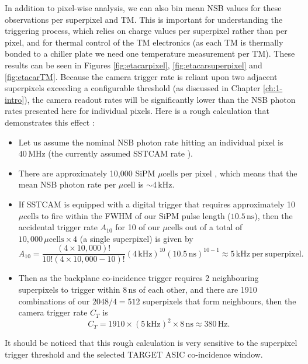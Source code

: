 In addition to pixel-wise analysis, we can also bin mean NSB values for these observations per superpixel and TM. This is important for understanding the triggering process, which relies on charge values per superpixel rather than per pixel, and for thermal control of the TM electronics (as each TM is thermally bonded to a chiller plate we need one temperature measurement per TM). These results can be seen in Figures \ref{fig:etacarpixel}, \ref{fig:etacarsuperpixel} and \ref{fig:etacarTM}. Because the camera trigger rate is reliant upon two adjacent superpixels exceeding a configurable threshold (as discussed in Chapter \ref{ch:1-intro}), the camera readout rates will be significantly lower than the NSB photon rates presented here for individual pixels. Here is a rough calculation that demonstrates this effect \cite{richpc}:

\begin{itemize}
    \item Let us assume the nominal NSB photon rate hitting an individual pixel is $40\,\mathrm{MHz}$ (the currently assumed SSTCAM rate \cite{richpc}).
    \item There are approximately 10,000 SiPM $\mu\textrm{cells}$ per pixel \cite{jasonthesis}, which means that the mean NSB photon rate per $\mu\textrm{cell}$ is $\sim4\,\mathrm{kHz}$.
    \item If SSTCAM is equipped with a digital trigger that requires approximately 10 $\mu\textrm{cells}$ to fire within the FWHM of our SiPM pulse length ($10.5\,\mathrm{ns}$), then the accidental trigger rate $A_{10}$ for 10 of our $\mu\textrm{cells}$ out of a total of $10,000\,\mu\textrm{cells}\times4$ (a single superpixel) is given by \cite{bradbury}
    \begin{equation}
        A_{10}=\frac{(4 \times 10,000)!}{10!(4 \times 10,000 - 10)!}(4\,\mathrm{kHz})^{10}(10.5\,\mathrm{ns})^{10-1} \approx 5\,\mathrm{kHz\ per\ superpixel}.
    \end{equation}
    \item Then as the backplane co-incidence trigger requires 2 neighbouring superpixels to trigger within $8\,\mathrm{ns}$ of each other, and there are 1910 combinations of our $2048/4=512$ superpixels that form neighbours, then the camera trigger rate $C_T$ is
    \begin{equation}
        C_T = 1910 \times (5\,\mathrm{kHz})^2 \times 8\,\mathrm{ns} \approx 380\,\mathrm{Hz}.
    \end{equation}
\end{itemize}
It should be noticed that this rough calculation is very sensitive to the superpixel trigger threshold and the selected TARGET ASIC co-incidence window. 

